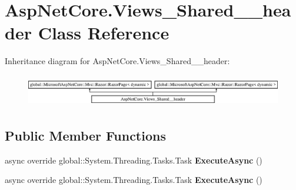 \hypertarget{class_asp_net_core_1_1_views___shared____header}{}\section{Asp\+Net\+Core.\+Views\+\_\+\+Shared\+\_\+\+\_\+header Class Reference}
\label{class_asp_net_core_1_1_views___shared____header}
Inheritance diagram for Asp\+Net\+Core.\+Views\+\_\+\+Shared\+\_\+\+\_\+header\+:\begin{figure}[H]
\begin{center}
\leavevmode
\includegraphics[height=1.432225cm]{class_asp_net_core_1_1_views___shared____header}
\end{center}
\end{figure}
\subsection*{Public Member Functions}
\begin{DoxyCompactItemize}
\item 
\mbox{\label{class_asp_net_core_1_1_views___shared____header_a479df0d1524e437d0e4b95854f93c04e}} 
async override global\+::\+System.\+Threading.\+Tasks.\+Task {\bfseries Execute\+Async} ()
\item 
\mbox{\label{class_asp_net_core_1_1_views___shared____header_a479df0d1524e437d0e4b95854f93c04e}} 
async override global\+::\+System.\+Threading.\+Tasks.\+Task {\bfseries Execute\+Async} ()
\end{DoxyCompactItemize}
